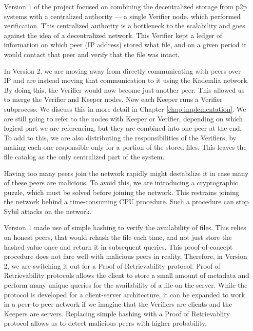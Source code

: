 Version 1 of the project focused on combining the decentralized storage from p2p systems with a centralized authority — a single Verifier node, which performed verification.
This centralized authority is a bottleneck to the scalability and goes against the idea of a decentralized network.
This Verifier kept a ledger of information on which peer (IP address) stored what file, and on a given period it would contact that peer and verify that the file was intact.

In Version 2, we are moving away from directly communicating with peers over IP and are instead moving that communication to it using the Kademlia network.
By doing this, the Verifier would now become just another peer.
This allowed us to merge the Verifier and Keeper nodes.
Now each Keeper runs a Verifier subprocess.
We discuss this in more detail in Chapter \ref{chap:implementation}.
We are still going to refer to the nodes with Keeper or Verifier, depending on which logical part we are referencing, but they are combined into one peer at the end.
To add to this, we are also distributing the responsibilities of the Verifiers, by making each one responsible only for a portion of the stored files.
This leaves the file catalog as the only centralized part of the system.

Having too many peers join the network rapidly might destabilize it in case many of these peers are malicious.
To avoid this, we are introducing a cryptographic puzzle, which must be solved before joining the network.
This restrains joining the network behind a time-consuming CPU procedure.
Such a procedure can stop Sybil attacks on the network.

Version 1 made use of simple hashing to verify the availability of files.
This relies on honest peers, that would rehash the file each time, and not just store the hashed value once and return it in subsequent queries.
This proof-of-concept procedure does not fare well with malicious peers in reality.
Therefore, in Version 2, we are switching it out for a Proof of Retrievability\cite{porfirst} protocol.
Proof of Retrievability protocols allows the client to store a small amount of metadata and perform many unique queries for the availability of a file on the server.
While the protocol is developed for a client-server architecture, it can be expanded to work in a peer-to-peer network if we imagine that the Verifiers are clients and the Keepers are servers.
Replacing simple hashing with a Proof of Retrievablity protocol allows us to detect malicious peers with higher probability.
